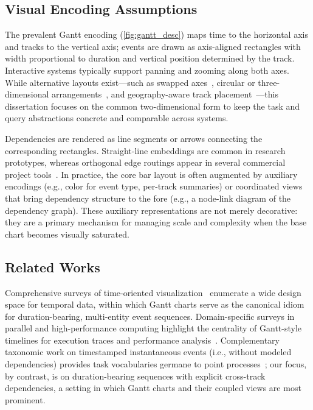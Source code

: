 \begin{refsection}

\subsection{Visual Encoding Assumptions}
\label{subsec:gantt-encoding}
The prevalent Gantt encoding (\autoref{fig:gantt_desc}) maps time to the horizontal axis and tracks to the vertical axis; events are drawn as axis-aligned rectangles with width proportional to duration and vertical position determined by the track. Interactive systems typically support panning and zooming along both axes. While alternative layouts exist---such as swapped axes~\cite{de2010zinsight}, circular or three-dimensional arrangements~\cite{devaux2014datatube4log}, and geography-aware track placement~\cite{schnorr2010triva}---this dissertation focuses on the common two-dimensional form to keep the task and query abstractions concrete and comparable across systems.

Dependencies are rendered as line segments or arrows connecting the corresponding rectangles. Straight-line embeddings are common in research prototypes, whereas orthogonal edge routings appear in several commercial project tools~\cite{aigner2011visualization}. In practice, the core bar layout is often augmented by auxiliary encodings (e.g., color for event type, per-track summaries) or coordinated views that bring dependency structure to the fore (e.g., a node-link diagram of the dependency graph). These auxiliary representations are not merely decorative: they are a primary mechanism for managing scale and complexity when the base chart becomes visually saturated.

\subsection{Related Works}
\label{subsec:gantt-related}
Comprehensive surveys of time-oriented visualization~\cite{aigner2011visualization, shurkhovetskyy2018data, guo2021survey} enumerate a wide design space for temporal data, within which Gantt charts serve as the canonical idiom for duration-bearing, multi-entity event sequences. Domain-specific surveys in parallel and high-performance computing highlight the centrality of Gantt-style timelines for execution traces and performance analysis~\cite{ezzati2017multi, isaacs2014state}. Complementary taxonomic work on timestamped instantaneous events (i.e., without modeled dependencies) provides task vocabularies germane to point processes~\cite{peiris2022data}; our focus, by contrast, is on duration-bearing sequences with explicit cross-track dependencies, a setting in which Gantt charts and their coupled views are most prominent.


\end{refsection}
